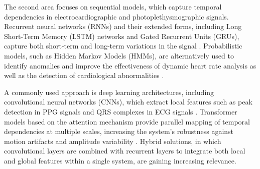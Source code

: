 \documentclass[journal]{IEEEtran}
\begin{document}
The second area focuses on sequential models, which capture temporal dependencies in electrocardiographic and photoplethysmographic signals. Recurrent neural networks (RNNs) and their extended forms, including Long Short-Term Memory (LSTM) networks and Gated Recurrent Units (GRUs), capture both short-term and long-term variations in the signal \cite{12}. Probabilistic models, such as Hidden Markov Models (HMMs), are alternatively used to identify anomalies and improve the effectiveness of dynamic heart rate analysis as well as the detection of cardiological abnormalities \cite{13}.

\newpage
A commonly used approach is deep learning architectures, including convolutional neural networks (CNNs), which extract local features such as peak detection in PPG signals and QRS complexes in ECG signals \cite{14}. Transformer models based on the attention mechanism provide parallel mapping of temporal dependencies at multiple scales, increasing the system's robustness against motion artifacts and amplitude variability \cite{15}. Hybrid solutions, in which convolutional layers are combined with recurrent layers to integrate both local and global features within a single system, are gaining increasing relevance.
\end{document}
